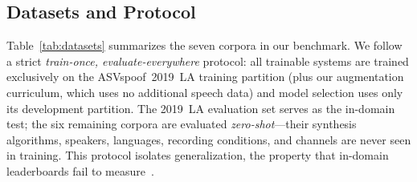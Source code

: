 
\subsection{Datasets and Protocol}
\label{ssec:datasets}

Table~\ref{tab:datasets} summarizes the seven corpora in our benchmark. We follow a
strict \emph{train-once, evaluate-everywhere} protocol: all trainable systems are
trained exclusively on the ASVspoof~2019~LA training partition (plus our augmentation
curriculum, which uses no additional speech data) and model selection uses only its
development partition. The 2019~LA evaluation set serves as the in-domain test; the six
remaining corpora are evaluated \emph{zero-shot}---their synthesis algorithms,
speakers, languages, recording conditions, and channels are never seen in training.
This protocol isolates generalization, the property that in-domain leaderboards fail to
measure~\cite{muller2022inthewild,muller2024harder}.

\begin{table}[t]
\centering
\caption{Evaluation corpora grouped by protocol role and the failure mode (G1--G3)
  each one probes.}
\label{tab:datasets}
\setlength{\tabcolsep}{3pt}
\footnotesize
{}
\end{table}

